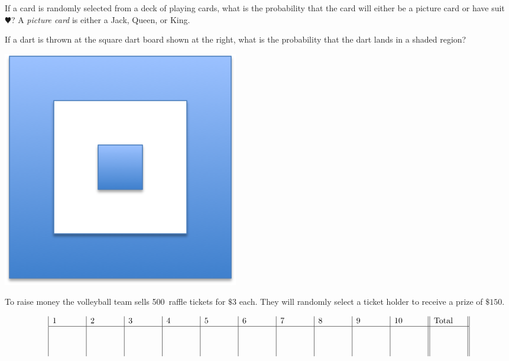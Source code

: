 \documentclass[addpoints,12pt]{exam}
\begin{document}
\begin{questions}
\question[10] If a card is randomly selected from a deck
of playing cards, what is the probability that the card
will either be a picture card or have suit $\varheart$?
A {\em picture card} is either a Jack, Queen, or King.
\newpage

\question[10]
\begin{multicols}{2}
If a dart is thrown at the square dart board shown at the right,
what is the probability that the dart lands in a shaded region?\\
\begin{center}\includegraphics[scale=.75]{Dart}\end{center}
\end{multicols}
\vspace{1in}

\question[10] To raise money the volleyball team sells 500~raffle tickets
for $\$3$ each. They will randomly select a ticket holder to receive
a prize of $\$150$.

\end{questions}

\vfill
\[\begin{array}
{|p{.5in}|p{.5in}|p{.5in}|p{.5in}|p{.5in}|p{.5in}|p{.5in}|p{.5in}|p{.5in}|p{.5in}||p{.5in}||}
1&2&3&4&5&6&7&8&9&10&\text{Total}\\\hline
\vspace{.5in}&&&&&&&&&&
\end{array}\]
\end{document}
